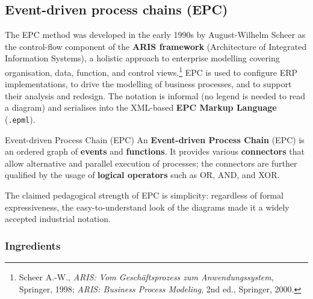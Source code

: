 \subsection{Event-driven process chains (EPC)}

The EPC method was developed in the early 1990s by August-Wilhelm Scheer as the control-flow component of the \textbf{ARIS framework} (Architecture of Integrated Information Systems), a holistic approach to enterprise modelling covering organisation, data, function, and control views.\footnote{Scheer A.-W., \emph{ARIS: Vom Gesch\"aftsprozess zum Anwendungssystem}, Springer, 1998; \emph{ARIS: Business Process Modeling}, 2nd ed., Springer, 2000.} EPC is used to configure ERP implementations, to drive the modelling of business processes, and to support their analysis and redesign. The notation is informal (no legend is needed to read a diagram) and serialises into the XML-based \textbf{EPC Markup Language} (\texttt{.epml}).

\begin{definitionbox}{Event-driven Process Chain (EPC)}
An \textbf{Event-driven Process Chain} (EPC) is an ordered graph of \textbf{events} and \textbf{functions}. It provides various \textbf{connectors} that allow alternative and parallel execution of processes; the connectors are further qualified by the usage of \textbf{logical operators} such as OR, AND, and XOR.
\end{definitionbox}

The claimed pedagogical strength of EPC is simplicity: regardless of formal expressiveness, the easy-to-understand look of the diagrams made it a widely accepted industrial notation.

\subsubsection{Ingredients}

\begin{center}
\end{center}

